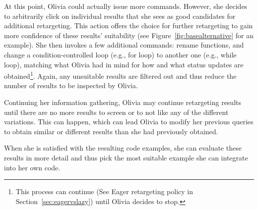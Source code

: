 At this point, Olivia could actually issue more commands. However, she decides to arbitrarily click on individual results that she sees as good candidates for additional retargeting. This action offers the choice for further retargeting to gain more confidence of these results' suitability (see Figure~\ref{fig:basealternative} for an example). She then invokes a few additional commands: rename functions, and change a condition-controlled loop (e.g., for loop) to another one (e.g., while loop), matching what Olivia had in mind for how and what status updates are obtained\footnote{This process can continue (See Eager retargeting policy in Section~\ref{sec:eagervslazy}) until Olivia decides to stop.}. Again, any unsuitable results are filtered out and thus reduce the number of results to be inspected by Olivia.

Continuing her information gathering, Olivia may continue retargeting results until there are no more results to screen or to not like any of the different variations. This can happen, which can lead Olivia to modify her previous queries to obtain similar or different results than she had previously obtained.

When she is satisfied with the resulting code examples, she can evaluate these results in more detail and thus pick the most suitable example she can integrate into her own code.

